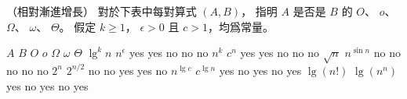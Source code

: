 \startPROBLEM
（相對漸進增長）
對於下表中每對算式 $(A, B)$，
指明 $A$ 是否是 $B$ 的 $O$、 $o$、 $\Omega$、 $\omega$、 $\Theta$。
假定 $k \ge 1$， $\epsilon > 0$ 且 $c > 1$，均爲常量。

\bTABLE[align=center]
\bTABLEhead
\bTR
	\bTH $A$ \eTH
	\bTH $B$ \eTH
	\bTH $O$ \eTH
	\bTH $o$ \eTH
	\bTH $\Omega$ \eTH
	\bTH $\omega$ \eTH
	\bTH $\Theta$ \eTH
\eTR
\eTABLEhead
\bTABLEbody
\bTR
	\bTD $\lg^k n$ \eTD
	\bTD $n^\epsilon$ \eTD
	\bTD\startANSWER yes \stopANSWER\eTD
	\bTD\startANSWER yes \stopANSWER\eTD
	\bTD\startANSWER no \stopANSWER\eTD
	\bTD\startANSWER no \stopANSWER\eTD
	\bTD\startANSWER no \stopANSWER\eTD
\eTR
\bTR
	\bTD $n^k$ \eTD
	\bTD $c^n$ \eTD
	\bTD\startANSWER yes \stopANSWER\eTD
	\bTD\startANSWER yes \stopANSWER\eTD
	\bTD\startANSWER no \stopANSWER\eTD
	\bTD\startANSWER no \stopANSWER\eTD
	\bTD\startANSWER no \stopANSWER\eTD
\eTR
\bTR
	\bTD $\sqrt{n}$ \eTD
	\bTD $n^{\sin n}$ \eTD
	\bTD\startANSWER no \stopANSWER\eTD
	\bTD\startANSWER no \stopANSWER\eTD
	\bTD\startANSWER no \stopANSWER\eTD
	\bTD\startANSWER no \stopANSWER\eTD
	\bTD\startANSWER no \stopANSWER\eTD
\eTR
\bTR
	\bTD $2^n$ \eTD
	\bTD $2^{n/2}$ \eTD
	\bTD\startANSWER no \stopANSWER\eTD
	\bTD\startANSWER no \stopANSWER\eTD
	\bTD\startANSWER yes \stopANSWER\eTD
	\bTD\startANSWER yes \stopANSWER\eTD
	\bTD\startANSWER no \stopANSWER\eTD
\eTR
\bTR
	\bTD $n^{\lg c}$ \eTD
	\bTD $c^{\lg n}$ \eTD
	\bTD\startANSWER yes \stopANSWER\eTD
	\bTD\startANSWER no \stopANSWER\eTD
	\bTD\startANSWER yes \stopANSWER\eTD
	\bTD\startANSWER no \stopANSWER\eTD
	\bTD\startANSWER yes \stopANSWER\eTD
\eTR
\bTR
	\bTD $\lg(n!)$ \eTD
	\bTD $\lg(n^n)$ \eTD
	\bTD\startANSWER yes \stopANSWER\eTD
	\bTD\startANSWER no \stopANSWER\eTD
	\bTD\startANSWER yes \stopANSWER\eTD
	\bTD\startANSWER no \stopANSWER\eTD
	\bTD\startANSWER yes \stopANSWER\eTD
\eTR
\eTABLEbody
\eTABLE
\stopPROBLEM
